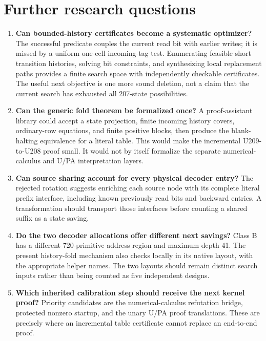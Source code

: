 \documentclass[11pt,letterpaper]{article}
\begin{document}
\section{Further research questions}
\begin{enumerate}
\item \textbf{Can bounded-history certificates become a systematic optimizer?}
The successful predicate couples the current read bit with earlier writes;
it is missed by a uniform one-cell incoming-tag test. Enumerating feasible
short transition histories, solving bit constraints, and synthesizing local
replacement paths provides a finite search space with independently
checkable certificates. The useful next objective is one more sound deletion,
not a claim that the current search has exhausted all 207-state possibilities.

\item \textbf{Can the generic fold theorem be formalized once?}
A proof-assistant library could accept a state projection, finite incoming
history covers, ordinary-row equations, and finite positive blocks, then
produce the blank-halting equivalence for a literal table. This would make
the incremental U209-to-U208 proof small. It would not by itself formalize
the separate numerical-calculus and U/PA interpretation layers.

\item \textbf{Can source sharing account for every physical decoder entry?}
The rejected rotation suggests enriching each source node with its complete
literal prefix interface, including known previously read bits and backward
entries. A transformation should transport those interfaces before counting
a shared suffix as a state saving.

\item \textbf{Do the two decoder allocations offer different next savings?}
Class B has a different 720-primitive address region and maximum depth 41.
The present history-fold mechanism also checks locally in its native
layout, with the appropriate helper names. The two layouts should remain
distinct search inputs rather than being counted as five independent designs.

\item \textbf{Which inherited calibration step should receive the next kernel proof?}
Priority candidates are the numerical-calculus refutation bridge, protected
nonzero startup, and the unary U/PA proof translations. These are precisely
where an incremental table certificate cannot replace an end-to-end proof.
\end{enumerate}
\end{document}
